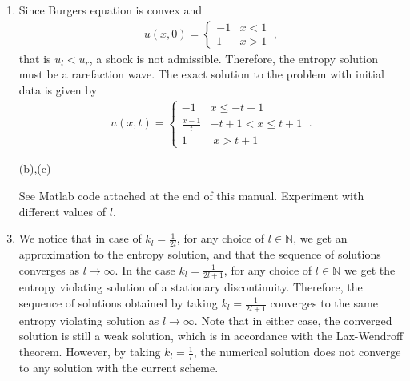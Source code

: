 \documentclass{article}
\begin{document}
\begin{exerciseList}
\item\label{exLWTNonConvSeq}
\begin{enumerate}
\item
Since Burgers equation is convex and
\begin{gather} \label{InCond}
	u(x,0)=\begin{cases}
		-1 & x<1\\
		1 & x>1
	\end{cases}\ ,
\end{gather}
that is $u_l<u_r$, a shock is not admissible.
Therefore, the entropy solution must be a rarefaction wave.
The exact solution to the problem with initial data  is given by
\begin{gather}
	u(x,t)=\begin{cases}
		-1 & x\leq-t+1\\
		\frac{x-1}{t} & -t+1<x\leq t+1\\
		1 & \; x>t+1
	\end{cases}\ .
\end{gather}

\item[(b),(c)]
\addtocounter{enumii}{2}
See Matlab code attached at the end of this manual. Experiment with different values of $l$.

\item
We notice that in case of $k_{l}=\frac{1}{2l}$, for any choice
of $l\in\mathbb{N}$, we get an approximation to the entropy solution,
and that the sequence of solutions converges as $l\rightarrow\infty$.
In the case $k_{l}=\frac{1}{2l+1}$, for any choice of $l\in\mathbb{N}$ we get the entropy violating solution of a stationary discontinuity.
Therefore, the sequence of solutions obtained by taking $k_{l}=\frac{1}{2l+1}$ converges to the same entropy violating solution as $l\rightarrow\infty$.
Note that in either case, the converged solution is still a weak solution, which is in accordance with the Lax-Wendroff theorem. However, by taking $k_{l}=\frac{1}{l}$, the numerical solution does not converge to any solution with the current scheme.
\end{enumerate}


\end{exerciseList}


%
%
%
%
%
\end{document}
